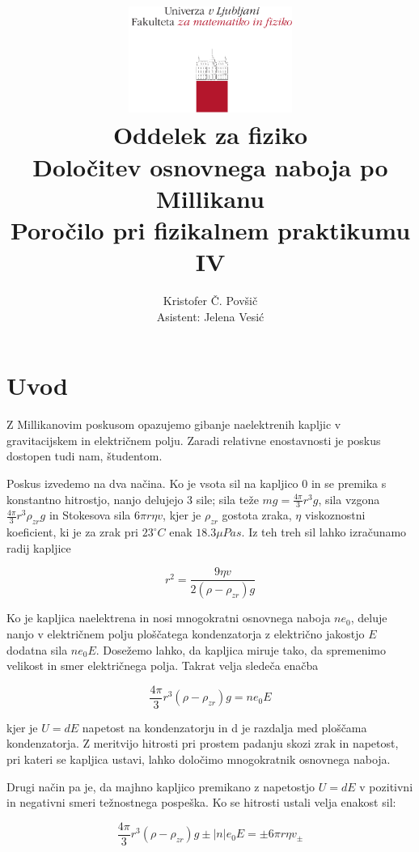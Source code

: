 \documentclass[12pt]{report}
\title{
  \includegraphics[width=0.4\textwidth]{fmf_logo}\\
  {\small Oddelek za fiziko} \\
  {Določitev osnovnega naboja po Millikanu}\\
  {\small Poročilo pri fizikalnem praktikumu IV}\\

}
\date{}
\author{ Kristofer Č. Povšič \\[5 cm]
 \small Asistent: Jelena Vesić
}
\begin{document}
\setcounter{page}{2}

\maketitle

\chapter*{Uvod}

Z Millikanovim poskusom opazujemo gibanje naelektrenih kapljic v gravitacijskem in električnem polju. Zaradi relativne enostavnosti je poskus dostopen tudi nam, študentom. 

Poskus izvedemo na dva načina. Ko je vsota sil na kapljico 0 in se premika s konstantno hitrostjo, nanjo delujejo 3 sile; sila teže $mg = \frac{4\pi}{3} r^3 g$, sila vzgona $\frac{4\pi}{3} r^3 \rho_{zr} g$ in Stokesova sila $6\pi r \eta v$, kjer je $\rho_{zr}$ gostota zraka, $\eta$ viskoznostni koeficient, ki je za zrak pri $23 ^\circ C$ enak $18.3 \mu Pas$. Iz teh treh sil lahko izračunamo radij kapljice

\begin{equation}
  r^2 = \frac{9\eta v}{2 (\rho - \rho_{zr})g}
\end{equation}

Ko je kapljica naelektrena in nosi mnogokratni osnovnega naboja $ne_0$, deluje nanjo v električnem polju ploščatega kondenzatorja z električno jakostjo $E$ dodatna sila $ne_0 E$. Dosežemo lahko, da kapljica miruje tako, da spremenimo velikost in smer električnega polja. Takrat velja sledeča enačba

\begin{equation}
  \frac{4\pi}{3} r^3 (\rho - \rho_{zr}) g = ne_0 E 
\end{equation}

kjer je $U = dE$ napetost na kondenzatorju in d je razdalja med ploščama kondenzatorja. Z meritvijo hitrosti pri prostem padanju skozi zrak in napetost, pri kateri se kapljica ustavi, lahko določimo mnogokratnik osnovnega naboja. 

Drugi način pa je, da majhno kapljico premikano z napetostjo $U=dE$ v pozitivni in negativni smeri težnostnega pospeška. Ko se hitrosti ustali velja enakost sil: 

\begin{equation}
  \frac{4\pi}{3} r^3 (\rho - \rho_{zr}) g \pm |n|e_0 E = \pm 6\pi r \eta v_{\pm}
\end{equation}
\end{document}
